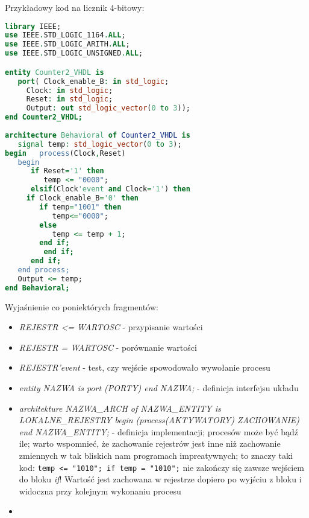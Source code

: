 Przykładowy kod na licznik 4-bitowy:

\begin{lstlisting}[language=VHDL]
library IEEE;
use IEEE.STD_LOGIC_1164.ALL;
use IEEE.STD_LOGIC_ARITH.ALL;
use IEEE.STD_LOGIC_UNSIGNED.ALL;

entity Counter2_VHDL is
   port( Clock_enable_B: in std_logic;
 	 Clock: in std_logic;
 	 Reset: in std_logic;
 	 Output: out std_logic_vector(0 to 3));
end Counter2_VHDL;
 
architecture Behavioral of Counter2_VHDL is
   signal temp: std_logic_vector(0 to 3);
begin   process(Clock,Reset)
   begin
      if Reset='1' then
         temp <= "0000";
      elsif(Clock'event and Clock='1') then
 	 if Clock_enable_B='0' then
	    if temp="1001" then
	       temp<="0000";
	    else
	       temp <= temp + 1;
	    end if;
         end if;
      end if;
   end process;
   Output <= temp;
end Behavioral;
\end{lstlisting}

Wyjaśnienie co poniektórych fragmentów:
\begin{itemize}
\item \emph{REJESTR <= WARTOSC} - przypisanie wartości
\item \emph{REJESTR = WARTOSC} - porównanie wartości
\item \emph{REJESTR'event} - test, czy wejście spowodowało wywołanie procesu
\item \emph{entity NAZWA is port (PORTY) end NAZWA;} - definicja interfejsu układu
\item \emph{architekture NAZWA\_ARCH of NAZWA\_ENTITY is LOKALNE\_REJESTRY begin (process(AKTYWATORY) ZACHOWANIE) end NAZWA\_ENTITY;} - definicja implementacji; procesów może być bądź ile; warto wspomnieć, że zachowanie rejestrów jest inne niż zachowanie zmiennych w tak bliskich nam programach impreatywnych; to znaczy taki kod: \lstinline|temp <= "1010"; if temp = "1010";| nie zakończy się zawsze wejściem do bloku \emph{if}! Wartość jest zachowana w rejestrze dopiero po wyjściu z bloku i widoczna przy kolejnym wykonaniu procesu
\item 
\end{itemize}

